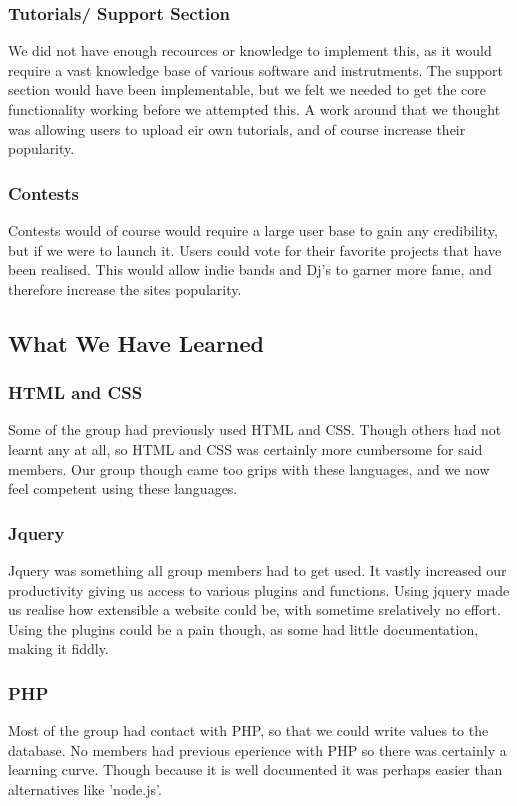 \documentclass{article}
\begin{document}
\subsubsection{Tutorials/ Support Section}
 We did not have enough recources or knowledge to implement this, as it would require a vast knowledge base of various software and instrutments. The support section would have been implementable, but we felt we needed to get the core functionality working before we attempted this. A work around that we thought was allowing users to upload eir own tutorials, and of course increase their popularity. 
\subsubsection{Contests}
 Contests would of course would require a large user base to gain any credibility, but if we were to launch it. Users could vote for their favorite projects that have been realised. This would allow indie bands and Dj's to garner more fame, and therefore increase the sites popularity.
\subsection{What We Have Learned}
  \subsubsection{HTML and CSS}
  Some of the group had previously used HTML and CSS. Though others had not learnt any at all, so HTML and CSS was certainly more cumbersome for said members. Our group though came too grips with these languages, and we now feel competent using these languages. 
  \subsubsection{Jquery}
  Jquery was something all group members had to get used. It vastly increased our productivity giving us access to various plugins and functions. Using jquery made us realise how extensible a website could be, with sometime srelatively no effort. Using the plugins could be a pain though, as some had little documentation, making it fiddly.
  \subsubsection{PHP}
  Most of the group had contact with PHP, so that we could write values to the database. No members had previous eperience with PHP so there was certainly a learning curve. Though because it is well documented it was perhaps easier than alternatives like 'node.js'. 
\end{document}
